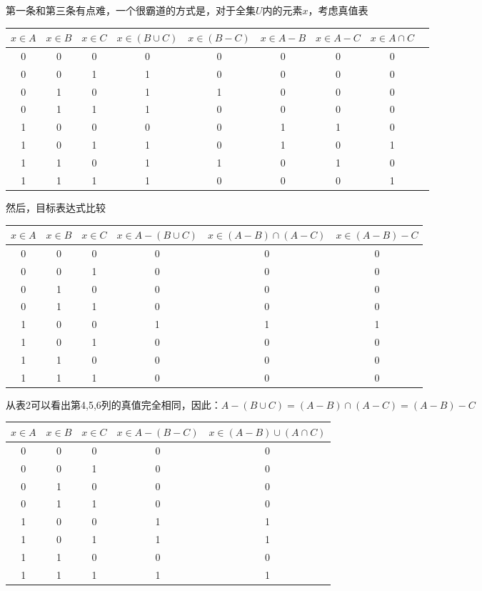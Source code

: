 \documentclass[lang=cn,11pt]{elegantbook}
\begin{document}
第一条和第三条有点难，一个很霸道的方式是，对于全集$U$内的元素$x$，考虑真值表
\begin{center}
\begin{tabular}{ccc|cccccc}
$x \in A$ & $x \in B$ & $x \in C$ & $x \in (B \cup C)$ & $x \in (B - C)$ & $x \in A - B$ & $x \in A - C$ & $x \in A \cap C$ \\
\hline
0 & 0 & 0 & 0 & 0 & 0 & 0 & 0 \\
0 & 0 & 1 & 1 & 0 & 0 & 0 & 0 \\
0 & 1 & 0 & 1 & 1 & 0 & 0 & 0 \\
0 & 1 & 1 & 1 & 0 & 0 & 0 & 0 \\
1 & 0 & 0 & 0 & 0 & 1 & 1 & 0 \\
1 & 0 & 1 & 1 & 0 & 1 & 0 & 1 \\
1 & 1 & 0 & 1 & 1 & 0 & 1 & 0 \\
1 & 1 & 1 & 1 & 0 & 0 & 0 & 1 \\
\end{tabular}
\end{center}
然后，目标表达式比较
\begin{center}
\begin{tabular}{ccc|ccc}
$x \in A$ & $x \in B$ & $x \in C$ & $x \in A - (B \cup C)$ & $x \in (A - B) \cap (A - C)$ & $x \in (A - B) - C$ \\
\hline
0 & 0 & 0 & 0 & 0 & 0 \\
0 & 0 & 1 & 0 & 0 & 0 \\
0 & 1 & 0 & 0 & 0 & 0 \\
0 & 1 & 1 & 0 & 0 & 0 \\
1 & 0 & 0 & 1 & 1 & 1 \\
1 & 0 & 1 & 0 & 0 & 0 \\
1 & 1 & 0 & 0 & 0 & 0 \\
1 & 1 & 1 & 0 & 0 & 0 \\
\end{tabular}
\end{center}
从表2可以看出第4,5,6列的真值完全相同，因此：$A - (B \cup C) = (A - B) \cap (A - C) = (A - B) - C$
\begin{center}
\begin{tabular}{ccc|cc}
$x \in A$ & $x \in B$ & $x \in C$ & $x \in A - (B - C)$ & $x \in (A - B) \cup (A \cap C)$ \\
\hline
0 & 0 & 0 & 0 & 0 \\
0 & 0 & 1 & 0 & 0 \\
0 & 1 & 0 & 0 & 0 \\
0 & 1 & 1 & 0 & 0 \\
1 & 0 & 0 & 1 & 1 \\
1 & 0 & 1 & 1 & 1 \\
1 & 1 & 0 & 0 & 0 \\
1 & 1 & 1 & 1 & 1 \\
\end{tabular}
\end{center}
\end{document}
